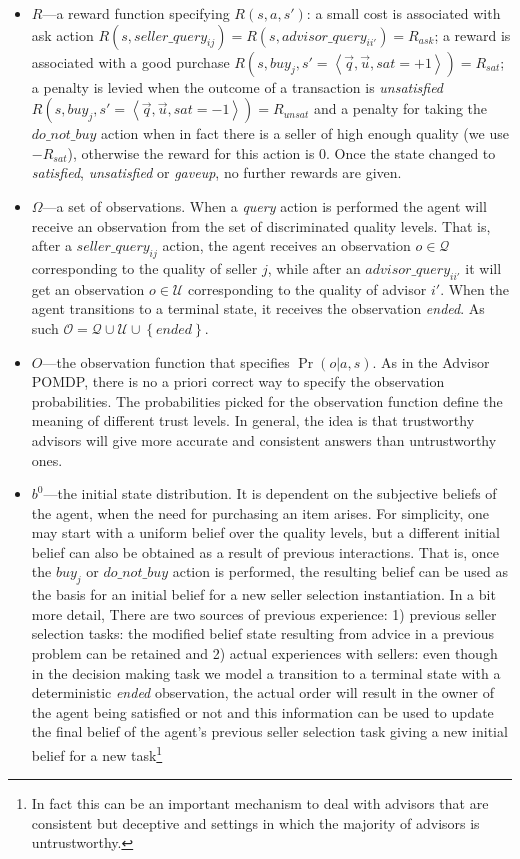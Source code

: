 \documentclass{aamas2013}
\begin{document}
\begin{itemize}
\item $R$---a reward function specifying $R(s,a,s')$: a small cost is associated with ask action $R(s,seller\_query_{ij})=R(s,advisor\_query_{ii'})=R_{ask}$; a reward is associated with a good purchase $R(s,buy_j,s'=\left\langle \vec{q},\vec{u},sat=+1\right\rangle )=R_{sat}$; a penalty is levied when the outcome of a transaction is \emph{unsatisfied} $R(s,buy_j,s'=\left\langle\vec{q},\vec{u},sat=-1\right\rangle )=R_{unsat}$ and a penalty for taking the $do\_not\_buy$ action when in fact there is a seller of high enough quality (we use $-R_{sat}$), otherwise the reward for this action is $0$. Once the state changed to \textit{satisfied}, \textit{unsatisfied} or \textit{gaveup}, no further rewards are given.
\item $\Omega$---a set of observations. When a \emph{query} action is performed the agent will receive an observation from the set of discriminated quality levels. That is, after a $seller\_query_{ij}$ action, the agent receives an observation $o\in\mathcal{Q}$ corresponding to the quality of seller $j$, while after an $advisor\_query_{ii'}$ it will get an observation $o\in\mathcal{U}$ corresponding to the quality of advisor $i'$. When the agent transitions to a terminal state, it receives the observation \textit{ended}. As such $\mathcal{O}=\mathcal{Q}\cup\mathcal{U}\cup\left\{ ended\right\} $.
\item $O$---the observation function that specifies $\Pr(o|a,s)$. As in the Advisor POMDP, there is no a priori correct way to specify the observation probabilities. The probabilities picked for the observation function define the meaning of different trust levels. In general, the idea is that trustworthy advisors will give more accurate and consistent answers than untrustworthy ones.
\item $b^{0}$---the initial state distribution. It is dependent on the subjective beliefs of the agent, when the need for purchasing an item arises. For simplicity, one may start with a uniform belief over the quality levels, but a different initial belief can also be obtained as a result of previous interactions. That is, once the $buy_j$ or $do\_not\_buy$ action is performed, the resulting belief can be used as the basis for an initial belief for a new seller selection instantiation. In a bit more detail, There are two sources of previous experience: 1) previous seller selection tasks: the modified belief state resulting from advice in a previous problem can be retained and 2) actual experiences with sellers: even though in the decision making task we model a transition to a terminal state with a deterministic \emph{ended} observation, the actual order will result in the owner of the agent being satisfied or not and this information can be used to update the final belief of the agent's previous seller selection task giving a new initial belief for a new task\footnote{In fact this can be an important mechanism to deal with advisors that are consistent but deceptive and settings in which the majority of advisors is untrustworthy.}

\end{itemize}
\end{document}
